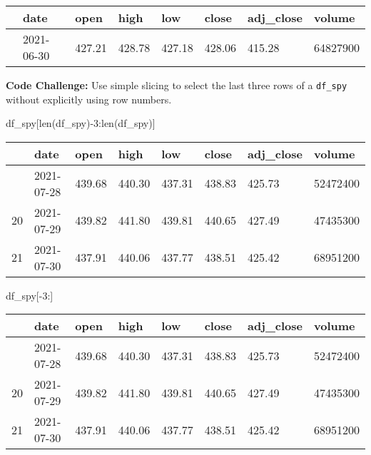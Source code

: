 \documentclass[
  letterpaper,
  DIV=11,
  numbers=noendperiod]{scrreprt}
\newenvironment{Shaded}{\begin{snugshade}}{\end{snugshade}}
\newcommand{\BuiltInTok}[1]{\textcolor[rgb]{0.00,0.23,0.31}{#1}}
\newcommand{\DecValTok}[1]{\textcolor[rgb]{0.68,0.00,0.00}{#1}}
\newcommand{\NormalTok}[1]{\textcolor[rgb]{0.00,0.23,0.31}{#1}}
\newcommand{\OperatorTok}[1]{\textcolor[rgb]{0.37,0.37,0.37}{#1}}
\begin{document}
\begin{longtable}[]{@{}llllllll@{}}
\toprule\noalign{}
& date & open & high & low & close & adj\_close & volume \\
\midrule\noalign{}
\endhead
\bottomrule\noalign{}
\endlastfoot
0 & 2021-06-30 & 427.21 & 428.78 & 427.18 & 428.06 & 415.28 &
64827900 \\
\end{longtable}

\textbf{Code Challenge:} Use simple slicing to select the last three
rows of a \texttt{df\_spy} without explicitly using row numbers.

\begin{Shaded}
\begin{Highlighting}[]
\NormalTok{df\_spy[}\BuiltInTok{len}\NormalTok{(df\_spy)}\OperatorTok{{-}}\DecValTok{3}\NormalTok{:}\BuiltInTok{len}\NormalTok{(df\_spy)]}
\end{Highlighting}
\end{Shaded}

\begin{longtable}[]{@{}llllllll@{}}
\toprule\noalign{}
& date & open & high & low & close & adj\_close & volume \\
\midrule\noalign{}
\endhead
\bottomrule\noalign{}
\endlastfoot
19 & 2021-07-28 & 439.68 & 440.30 & 437.31 & 438.83 & 425.73 &
52472400 \\
20 & 2021-07-29 & 439.82 & 441.80 & 439.81 & 440.65 & 427.49 &
47435300 \\
21 & 2021-07-30 & 437.91 & 440.06 & 437.77 & 438.51 & 425.42 &
68951200 \\
\end{longtable}

\begin{Shaded}
\begin{Highlighting}[]
\NormalTok{df\_spy[}\OperatorTok{{-}}\DecValTok{3}\NormalTok{:]}
\end{Highlighting}
\end{Shaded}

\begin{longtable}[]{@{}llllllll@{}}
\toprule\noalign{}
& date & open & high & low & close & adj\_close & volume \\
\midrule\noalign{}
\endhead
\bottomrule\noalign{}
\endlastfoot
19 & 2021-07-28 & 439.68 & 440.30 & 437.31 & 438.83 & 425.73 &
52472400 \\
20 & 2021-07-29 & 439.82 & 441.80 & 439.81 & 440.65 & 427.49 &
47435300 \\
21 & 2021-07-30 & 437.91 & 440.06 & 437.77 & 438.51 & 425.42 &
68951200 \\
\end{longtable}
\end{document}
